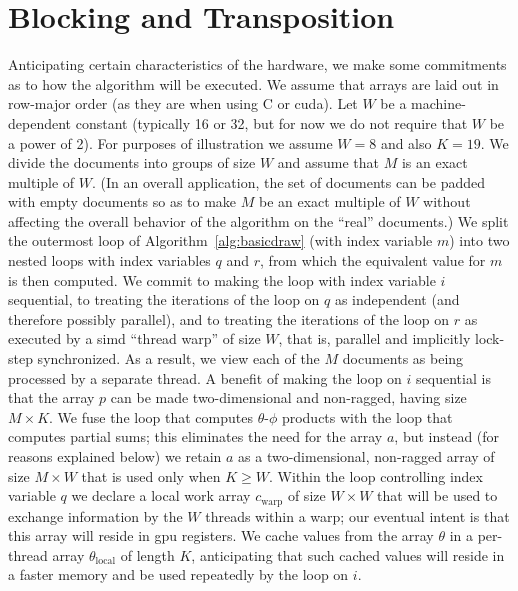 \documentclass[10pt,nohyperref]{sigplanconf}
\begin{document}
\section{Blocking and Transposition}

Anticipating certain characteristics of the hardware,
we make some commitments as to how the algorithm will be executed.  We assume that
arrays are laid out in row-major order (as they are when using C or {\sc cuda}).
Let $W$ be a
machine-dependent constant (typically 16 or 32, but for now we do not require that $W$ be a power of 2).
For purposes of illustration we assume $W=8$ and also $K=19$.
We divide the documents into groups of size $W$ and assume that $M$ is an exact multiple of $W$.
(In an overall application, the set of documents can be padded with empty documents
so as to make $M$ be an exact multiple of $W$ without affecting the overall behavior of the algorithm on the ``real'' documents.)
We split the outermost loop of Algorithm~\ref{alg:basicdraw} (with index variable $m$) into two nested loops with
index variables $q$ and $r$, from which the equivalent value for $m$ is then computed.
We commit to making the loop with index variable $i$ sequential,
to treating the iterations of the loop on $q$ as independent (and therefore possibly parallel),
and to treating the iterations of the loop on $r$ as executed by a {\sc simd} ``thread warp'' of size $W$, that is,
parallel and implicitly lock-step synchronized.
As a result, we view each of the $M$ documents as being processed by a separate thread.
A benefit of making the loop on $i$ sequential is that the array $p$ can be made two-dimensional and non-ragged,
having size $M \times K$.  We fuse the loop that computes $\theta$-$\phi$ products
with the loop that computes partial sums; this eliminates the need for the array $a$,
but instead (for reasons explained below) we retain $a$ as a two-dimensional, non-ragged array of size $M \times W$
that is used only when $K \geq W$.  Within the loop controlling index variable $q$ we declare a local work array $c_{\mathrm{warp}}$
of size $W \times W$ that will be used to exchange information by the $W$ threads within a warp; our eventual intent
is that this array will reside in {\sc gpu} registers.
We cache values from the array $\theta$ in a per-thread array $\theta_{\mathrm{local}}$ of length $K$,
anticipating that such cached values will reside in a faster memory and
be used repeatedly by the loop on $i$.
\end{document}
